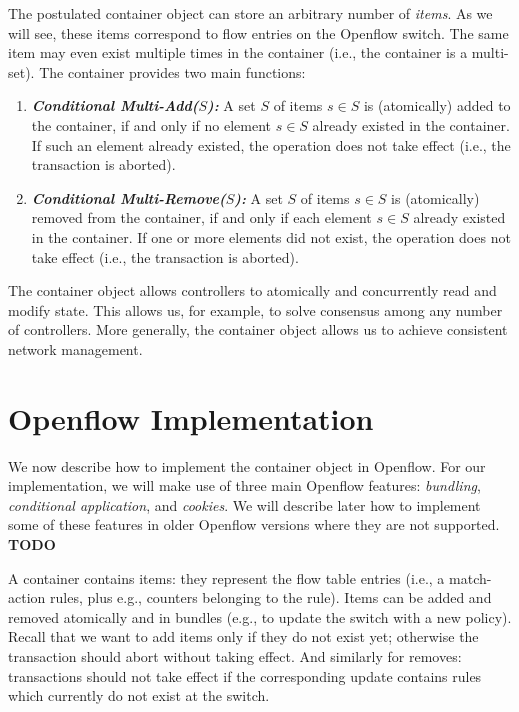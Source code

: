 \documentclass[conference]{sigcomm-alternate}
\begin{document}
The postulated container object can store an arbitrary number of \emph{items}.
As we will see, these items correspond to flow entries on the Openflow switch.
The same item may even exist multiple times in the container (i.e., the container
is a multi-set).
The container
provides two main functions:
\begin{enumerate}
\item \textbf{\emph{Conditional Multi-Add($S$):}} A set $S$ of items $s\in S$
is (atomically) added to the container, if and only if no element $s\in S$
already existed in the container. If such an element already existed,
the operation does not take effect (i.e., the transaction is aborted).

\item \textbf{\emph{Conditional Multi-Remove($S$):}} A set $S$ of items $s\in S$
is (atomically) removed from the container, if and only if each element $s\in S$
already existed in the container. If one or more elements did not exist,
the operation does not take effect (i.e., the transaction is aborted).
\end{enumerate}

The container object allows controllers to atomically and
concurrently read and modify state. This
allows us, for example, to solve consensus among any
number of controllers.
More generally, the container object
allows us to
achieve consistent network management.

\section{Openflow Implementation}\label{sec:container}

We now describe how to implement the container object
in Openflow. For our implementation, we will make
use of three main Openflow features: \emph{bundling},
\emph{conditional application}, and \emph{cookies}.
We will describe later how to implement some of these features
in older Openflow versions where they are not supported. \textbf{TODO}

A container contains items: they represent the flow table entries (i.e., a match-action rules, plus e.g., counters belonging to the rule).
Items can be added and removed atomically and in bundles (e.g., to update the switch with
a new policy). Recall that we want to add items only if they do not exist
yet; otherwise the transaction should abort without taking effect.
And similarly for removes: transactions should not take effect if the corresponding
update contains rules which currently do not exist at the switch.
\end{document}
